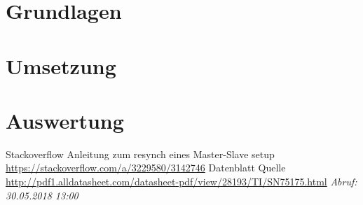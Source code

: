 \documentclass[a4paper,headsepline,bibliography=totoc,listof=totoc]{scrartcl}							%
\begin{document}
\section{Grundlagen}
\label{chp:Grundlagen}


\newcommand{\pthUmsetzung}{\pthChps/umsetzung}
\section{Umsetzung}
\label{chp:Umsetzung}


\newcommand{\pthAuswertung}{\pthChps/auswertung}
\section{Auswertung}
\label{chp:Auswertung}




%






\newpage

\listoffigures
\newpage
\listoftables

\newpage
\lstlistoflistings	

 \begin{thebibliography}{999}
  
   Stackoverflow Anleitung zum resynch eines Master-Slave setup \url{https://stackoverflow.com/a/3229580/3142746}
   Datenblatt Quelle \url{http://pdf1.alldatasheet.com/datasheet-pdf/view/28193/TI/SN75175.html} \textit{Abruf: 30.05.2018 13:00}
  \end{thebibliography}
\end{document}
